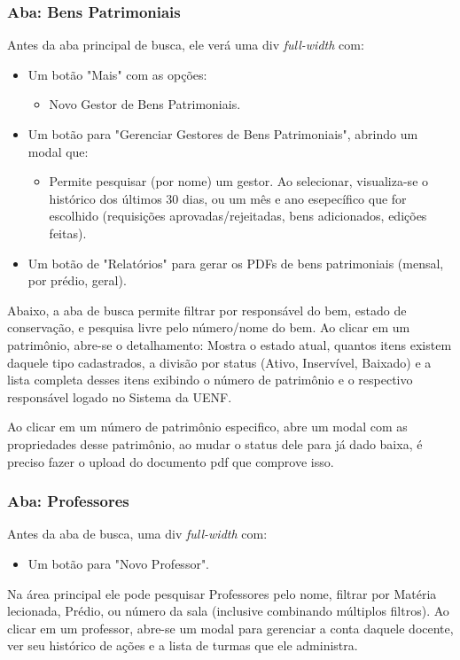 \documentclass[12pt,a4paper]{article}
\begin{document}
\subsubsection{Aba: Bens Patrimoniais}
Antes da aba principal de busca, ele verá uma div \textit{full-width} com:
\begin{itemize}
    \item Um botão "Mais" com as opções:
     \begin{itemize}
         \item Novo Gestor de Bens Patrimoniais. 
     \end{itemize}
    \item Um botão para "Gerenciar Gestores de Bens Patrimoniais", abrindo um modal que:
    \begin{itemize}
        \item Permite pesquisar (por nome) um gestor. Ao selecionar, visualiza-se o histórico dos últimos 30 dias, ou um mês e ano esepecífico que for escolhido (requisições aprovadas/rejeitadas, bens adicionados, edições feitas).
    \end{itemize}
    \item Um botão de "Relatórios" para gerar os PDFs de bens patrimoniais (mensal, por prédio, geral). 
\end{itemize} 
Abaixo, a aba de busca permite filtrar por responsável do bem, estado de conservação, e pesquisa livre pelo número/nome do bem. Ao clicar em um patrimônio, abre-se o detalhamento:
Mostra o estado atual, quantos itens existem daquele tipo cadastrados, a divisão por status (Ativo, Inservível, Baixado) e a lista completa desses itens exibindo o número de patrimônio e o respectivo responsável logado no Sistema da UENF.

Ao clicar em um número de patrimônio especifico, abre um modal com as propriedades desse patrimônio, ao mudar o status dele para já dado baixa, é preciso fazer o upload do documento pdf que comprove isso. 
\subsubsection{Aba: Professores}
Antes da aba de busca, uma div \textit{full-width} com:
\begin{itemize}
    \item Um botão para "Novo Professor".
\end{itemize} 
Na área principal ele pode pesquisar Professores pelo nome, filtrar por Matéria lecionada, Prédio, ou número da sala (inclusive combinando múltiplos filtros). Ao clicar em um professor, abre-se um modal para gerenciar a conta daquele docente, ver seu histórico de ações e a lista de turmas que ele administra.
\end{document}
